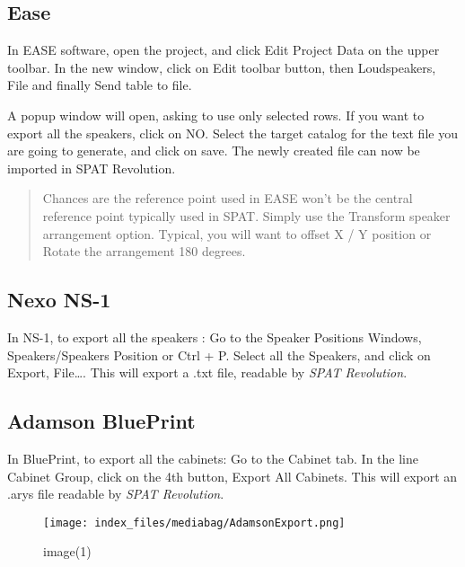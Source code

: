 \documentclass[
  letterpaper,
  DIV=11,
  numbers=noendperiod]{scrreport}
\begin{document}
\hypertarget{ease}{%
\subsection{Ease}\label{ease}}

In EASE software, open the project, and click Edit Project Data on the
upper toolbar. In the new window, click on Edit toolbar button, then
Loudspeakers, File and finally Send table to file.

A popup window will open, asking to use only selected rows. If you want
to export all the speakers, click on NO. Select the target catalog for
the text file you are going to generate, and click on save. The newly
created file can now be imported in SPAT Revolution.

\begin{quote}
Chances are the reference point used in EASE won't be the central
reference point typically used in SPAT. Simply use the Transform speaker
arrangement option. Typical, you will want to offset X / Y position or
Rotate the arrangement 180 degrees.
\end{quote}

\hypertarget{nexo-ns-1}{%
\subsection{Nexo NS-1}\label{nexo-ns-1}}

In NS-1, to export all the speakers : Go to the Speaker Positions
Windows, Speakers/Speakers Position or Ctrl + P. Select all the
Speakers, and click on Export, File\ldots{}. This will export a .txt
file, readable by \emph{SPAT Revolution}.

\hypertarget{adamson-blueprint}{%
\subsection{Adamson BluePrint}\label{adamson-blueprint}}

In BluePrint, to export all the cabinets: Go to the Cabinet tab. In the
line Cabinet Group, click on the 4th button, Export All Cabinets. This
will export an .arys file readable by \emph{SPAT Revolution}.

\begin{figure}

{\centering \texttt{[image: index\_files/mediabag/AdamsonExport.png]}

}

\caption{image(1)}

\end{figure}
\end{document}
